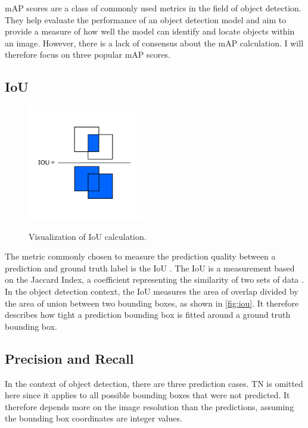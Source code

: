 \documentclass[10pt]{book}
\newcommand{\figureref}[1]{\autoref{#1}}
\begin{document}
\ac{mAP} scores are a class of commonly used metrics in the field of object detection. They help evaluate the performance of an object detection model \cite{padilla2020survey} and aim to provide a measure of how well the model can identify and locate objects within an image. However, there is a lack of consensus about the \ac{mAP} calculation. I will therefore focus on three popular \ac{mAP} scores. 

\subsection{IoU}

\begin{figure}
  \caption{Visualization of \ac{IoU} calculation.}
  \includegraphics[width=0.45\textwidth]{image/iou}
  \label{fig:iou}
\end{figure}

The metric commonly chosen to measure the prediction quality between a prediction and ground truth label is the \ac{IoU} \cite{padilla2020survey}. The \ac{IoU} is a measurement based on the Jaccard Index, a coefficient representing the similarity of two sets of data \cite{jaccard1901etude}. In the object detection context, the \ac{IoU} measures the area of overlap divided by the area of union between two bounding boxes, as shown in \figureref{fig:iou}. It therefore describes how tight a prediction bounding box is fitted around a ground truth bounding box.

\subsection{Precision and Recall}

In the context of object detection, there are three prediction cases. \ac{TN} is omitted here since it applies to all possible bounding boxes that were not predicted. It therefore depends more on the image resolution than the predictions, assuming the bounding box coordinates are integer values.
\end{document}
